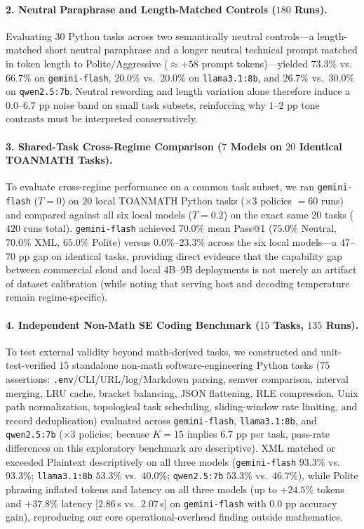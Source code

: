 \documentclass[a4paper,fleqn]{cas-sc}
\begin{document}
\paragraph{2. Neutral Paraphrase and Length-Matched Controls ($180$ Runs).}
Evaluating $30$ Python tasks across two semantically neutral controls---a length-matched short neutral paraphrase and a longer neutral technical prompt matched in token length to Polite/Aggressive ($\approx +58$ prompt tokens)---yielded $73.3\%$ vs.\ $66.7\%$ on \texttt{gemini-flash}, $20.0\%$ vs.\ $20.0\%$ on \texttt{llama3.1:8b}, and $26.7\%$ vs.\ $30.0\%$ on \texttt{qwen2.5:7b}. Neutral rewording and length variation alone therefore induce a $0.0$--$6.7$ pp noise band on small task subsets, reinforcing why $1$--$2$ pp tone contrasts must be interpreted conservatively.

\paragraph{3. Shared-Task Cross-Regime Comparison ($7$ Models on $20$ Identical TOANMATH Tasks).}
To evaluate cross-regime performance on a common task subset, we ran \texttt{gemini-flash} ($T = 0$) on $20$ local TOANMATH Python tasks ($\times 3$ policies $= 60$ runs) and compared against all six local models ($T = 0.2$) on the exact same $20$ tasks ($420$ runs total). \texttt{gemini-flash} achieved $70.0\%$ mean Pass@1 ($75.0\%$ Neutral, $70.0\%$ XML, $65.0\%$ Polite) versus $0.0\%$--$23.3\%$ across the six local models---a $47$--$70$ pp gap on identical tasks, providing direct evidence that the capability gap between commercial cloud and local 4B--9B deployments is not merely an artifact of dataset calibration (while noting that serving host and decoding temperature remain regime-specific).

\paragraph{4. Independent Non-Math SE Coding Benchmark ($15$ Tasks, $135$ Runs).}
To test external validity beyond math-derived tasks, we constructed and unit-test-verified $15$ standalone non-math software-engineering Python tasks ($75$ assertions: \texttt{.env}/CLI/URL/log/Markdown parsing, semver comparison, interval merging, LRU cache, bracket balancing, JSON flattening, RLE compression, Unix path normalization, topological task scheduling, sliding-window rate limiting, and record deduplication) evaluated across \texttt{gemini-flash}, \texttt{llama3.1:8b}, and \texttt{qwen2.5:7b} ($\times 3$ policies; because $K = 15$ implies $6.7$ pp per task, pass-rate differences on this exploratory benchmark are descriptive). XML matched or exceeded Plaintext descriptively on all three models (\texttt{gemini-flash} $93.3\%$ vs.\ $93.3\%$; \texttt{llama3.1:8b} $53.3\%$ vs.\ $40.0\%$; \texttt{qwen2.5:7b} $53.3\%$ vs.\ $46.7\%$), while Polite phrasing inflated tokens and latency on all three models (up to $+24.5\%$ tokens and $+37.8\%$ latency [$2.86$\,s vs.\ $2.07$\,s] on \texttt{gemini-flash} with $0.0$ pp accuracy gain), reproducing our core operational-overhead finding outside mathematics.
\end{document}
